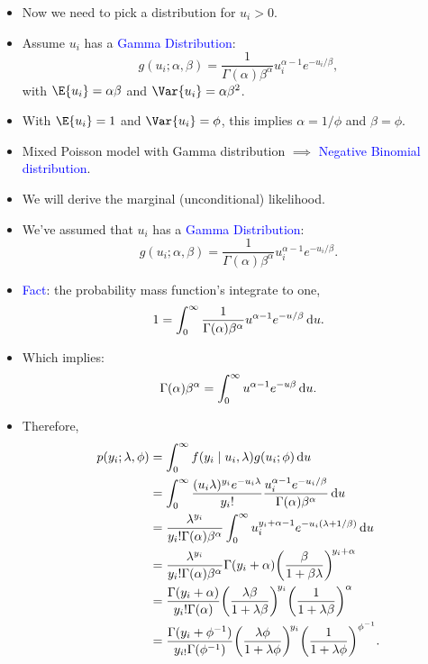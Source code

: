 \documentclass{article}\usepackage[]{graphicx}\usepackage[svgnames]{xcolor}
\begin{document}
\begin{itemize}
      \item Now we need to pick a distribution for $ u_i>0 $.
      \item Assume $ u_i $ has a \textcolor{Blue}{Gamma Distribution}:
            \[ g(u_i;\alpha,\beta)=\frac{1}{\Gamma(\alpha)\beta^\alpha}u_i^{\alpha-1}e^{-u_i/\beta}, \]
            with $ \E{u_i}=\alpha\beta $ and $ \Var{u_i}=\alpha\beta^2 $.
      \item With $ \E{u_i}=1 $ and $ \Var{u_i}=\phi $, this implies $ \alpha=1/\phi $ and $ \beta=\phi $.
      \item Mixed Poisson model with Gamma distribution $ \implies $ \textcolor{Blue}{Negative Binomial distribution}.
      \item We will derive the marginal (unconditional) likelihood.
      \item We've assumed that $ u_i $ has a \textcolor{Blue}{Gamma Distribution}:
            \[ g(u_i;\alpha,\beta)=\frac{1}{\Gamma(\alpha)\beta^\alpha}u_i^{\alpha-1}e^{-u_i/\beta}. \]
      \item \textcolor{Blue}{Fact}: the probability mass function's integrate to one,
            \[ 1=\int_{0}^{\infty}\frac{1}{\Gamma(\alpha)\beta^\alpha}u^{\alpha-1}e^{-u/\beta}\odif{u}. \]
      \item Which implies:
            \[ \Gamma(\alpha)\beta^\alpha=\int_{0}^{\infty}u^{\alpha-1}e^{-u\beta}\odif{u}. \]
      \item Therefore,
            \begin{align*}
                  p(y_i;\lambda,\phi)
                   & =\int_{0}^{\infty} f(y_i\mid u_i,\lambda) g(u_i; \phi) \odif{u}                                                                                                       \\
                   & =\int_{0}^{\infty} \frac{(u_i \lambda)^{y_i} e^{-u_i \lambda}}{y_i!}\frac{u_i^{\alpha-1} e^{-u_i / \beta}}{\Gamma(\alpha) \beta^{\alpha}} \odif{u}                    \\
                   & =\frac{\lambda^{y_i}}{y_i ! \Gamma(\alpha) \beta^{\alpha}} \int_{0}^{\infty} u_i^{y_i+\alpha-1} e^{-u_i(\lambda+1 / \beta)} \odif{u}                                  \\
                   & =\frac{\lambda^{y_i}}{y_i ! \Gamma(\alpha) \beta^{\alpha}} \Gamma(y_i+\alpha)\biggl(\frac{\beta}{1+\beta \lambda}\biggr)^{\! y_i+\alpha}                              \\
                   & =\frac{\Gamma(y_i+\alpha)}{y_i ! \Gamma(\alpha)}\biggl(\frac{\lambda \beta}{1+\lambda \beta}\biggr)^{\!y_i}\biggl(\frac{1}{1+\lambda \beta}\biggr)^{\alpha}           \\
                   & =\frac{\Gamma(y_i+\phi^{-1})}{y_{i !} \Gamma(\phi^{-1})}\biggl(\frac{\lambda \phi}{1+\lambda \phi}\biggr)^{\! y_i}\biggl(\frac{1}{1+\lambda \phi}\biggr)^{\phi^{-1}}.
            \end{align*}
\end{itemize}
\end{document}
